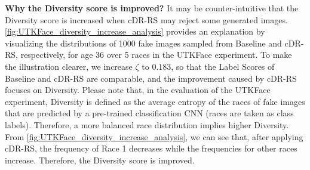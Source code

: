 \documentclass[final,12pt, 3p,times]{elsarticle}
\begin{document}
{\setlength{\parindent}{0cm}\textbf{Why the Diversity score is improved?}} 
It may be counter-intuitive that the Diversity score is increased when cDR-RS may reject some generated images. \cref{fig:UTKFace_diversity_increase_analysis} provides an explanation by visualizing the distributions of 1000 fake images sampled from Baseline and cDR-RS, respectively, for age 36 over 5 races in the UTKFace experiment. To make the illustration clearer, we increase $\zeta$ to $0.183$, so that the Label Scores of Baseline and cDR-RS are comparable, and the improvement caused by cDR-RS focuses on Diversity. Please note that, in the evaluation of the UTKFace experiment, Diversity is defined as the average entropy of the races of fake images that are predicted by a pre-trained classification CNN (races are taken as class labels). Therefore, a more balanced race distribution implies higher Diversity. From \cref{fig:UTKFace_diversity_increase_analysis}, we can see that, after applying cDR-RS, the frequency of Race 1 decreases while the frequencies for other races increase. Therefore, the Diversity score is improved. 
\end{document}
